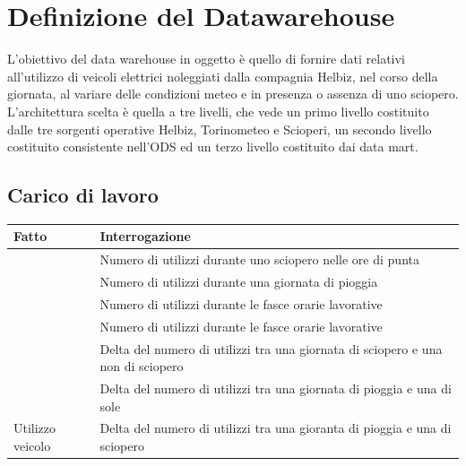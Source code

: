 \chapter{Definizione del Datawarehouse}

L'obiettivo del data warehouse in oggetto è quello di fornire dati relativi
all'utilizzo di veicoli elettrici noleggiati dalla compagnia Helbiz, nel corso
della giornata, al variare delle condizioni meteo e in presenza o assenza di uno
sciopero.
L'architettura scelta è quella a tre livelli, che vede un primo livello costituito
dalle tre sorgenti operative Helbiz, Torinometeo e Scioperi, un secondo livello
costituito consistente nell'ODS ed un terzo livello costituito dai data mart.

\section{Carico di lavoro}
\begin{table}[h]
\centering
\begin{tabular}{|l|l|}
\hline
\rowcolor[HTML]{3166FF} 
{\color[HTML]{FFFFFF} \textbf{Fatto}} & {\color[HTML]{FFFFFF} \textbf{Interrogazione}}                                  \\ \hline
                                      & Numero di utilizzi durante uno sciopero nelle ore di punta                      \\ \cline{2-2} 
                                      & Numero di utilizzi durante una giornata di pioggia                              \\ \cline{2-2} 
                                      & Numero di utilizzi durante le fasce orarie lavorative                           \\ \cline{2-2} 
                                      & Numero di utilizzi durante le fasce orarie lavorative                           \\ \cline{2-2} 
                                      & Delta del numero di utilizzi tra una giornata di sciopero e una non di sciopero \\ \cline{2-2} 
                                      & Delta del numero di utilizzi tra una giornata di pioggia e una di sole          \\ \cline{2-2} 
\multirow{-7}{*}{Utilizzo veicolo}    & Delta del numero di utilizzi tra una gioranta di pioggia e una di sciopero      \\ \hline
\end{tabular}
\end{table}

